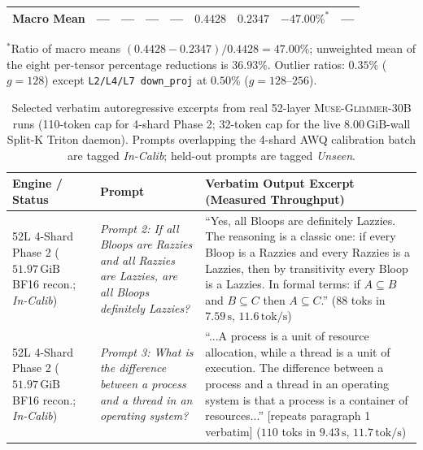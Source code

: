 \documentclass[10pt]{article} %
\newcommand{\glimmer}{\textsc{Muse-Glimmer-30B}}
\begin{document}
\begin{table}[htbp]
\begin{center}
\begin{tabular}{l l c c c r r r c}
\midrule
\textbf{Macro Mean} & --- & --- & --- & --- & $\mathbf{0.4428}$ & $\mathbf{0.2347}$ & $\mathbf{-47.00\%}^*$ & --- \\
\bottomrule
\end{tabular}
\par\vspace{3pt}
\parbox{\linewidth}{\scriptsize $^*$Ratio of macro means $(0.4428 - 0.2347)/0.4428 = 47.00\%$; unweighted mean of the eight per-tensor percentage reductions is $36.93\%$. Outlier ratios: $0.35\%$ ($g=128$) except \texttt{L2/L4/L7 down\_proj} at $0.50\%$ ($g=128$--$256$).}
\end{center}
\end{table}

\begin{table}[htbp]
\caption{Selected verbatim autoregressive excerpts from real 52-layer \glimmer{} runs (110-token cap for 4-shard Phase 2; 32-token cap for the live $8.00\,\text{GiB}$-wall Split-K Triton daemon). Prompts overlapping the 4-shard AWQ calibration batch are tagged \emph{In-Calib}; held-out prompts are tagged \emph{Unseen}.}
\label{tab:30b_transcripts}
\begin{center}
\scriptsize
\begin{tabularx}{\linewidth}{>{\raggedright\arraybackslash}p{2.5cm} >{\raggedright\arraybackslash}p{2.8cm} >{\raggedright\arraybackslash}X}
\toprule
\textbf{Engine / Status} & \textbf{Prompt} & \textbf{Verbatim Output Excerpt (Measured Throughput)} \\
\midrule
52L 4-Shard Phase 2 ($51.97\,\text{GiB}$ BF16 recon.; \emph{In-Calib}) & \emph{Prompt 2: If all Bloops are Razzies and all Razzies are Lazzies, are all Bloops definitely Lazzies?} & ``Yes, all Bloops are definitely Lazzies. The reasoning is a classic one: if every Bloop is a Razzies and every Razzies is a Lazzies, then by transitivity every Bloop is a Lazzies. In formal terms: if $A \subseteq B$ and $B \subseteq C$ then $A \subseteq C$.'' ($88$ toks in $7.59\,\text{s}$, $11.6\,\text{tok/s}$) \\
\midrule
52L 4-Shard Phase 2 ($51.97\,\text{GiB}$ BF16 recon.; \emph{In-Calib}) & \emph{Prompt 3: What is the difference between a process and a thread in an operating system?} & ``...A process is a unit of resource allocation, while a thread is a unit of execution. The difference between a process and a thread in an operating system is that a process is a container of resources...'' [repeats paragraph 1 verbatim] ($110$ toks in $9.43\,\text{s}$, $11.7\,\text{tok/s}$) \\

\end{tabularx}
\end{center}
\end{table}
\end{document}
